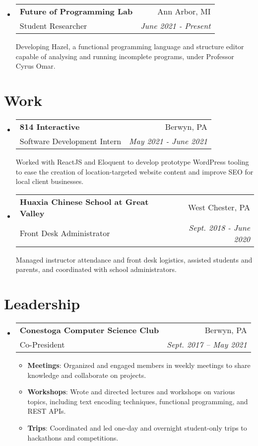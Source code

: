 \documentclass[letterpaper,11pt]{article}
\makeatletter
\newcommand{\resumeSubheading}[4]{
  \vspace{-2pt}\item
    \begin{tabular*}{0.97\textwidth}[t]{l@{\extracolsep{\fill}}r}
      \textbf{#1} & #2 \\
      {#3} & \textit{\small #4} \\[3pt]
    \end{tabular*}\vspace{-5pt}
}
\newcommand{\resumeSubheadingDescription}[1]{
  \parbox{0.97\textwidth}{#1}
}
\newenvironment{resumeSubHeadingList}{\begin{itemize}[leftmargin=*, label={}]}{\end{itemize}}
\newenvironment{resumeItemList}{\vspace{-2pt}\begin{itemize}}{\end{itemize}\vspace{-5pt}}
\newcommand{\resumeItem}[2]{\item\small{\textbf{#1}{: #2 \vspace{-2pt}}}}
\makeatother
\begin{document}
  \begin{resumeSubHeadingList}
    \resumeSubheading%
      {Future of Programming Lab}%
      {Ann Arbor, MI}%
      {Student Researcher}%
      {June 2021 - Present}

      \resumeSubheadingDescription{
        Developing Hazel, a functional programming language and structure editor capable of
        analysing and running incomplete programs, under Professor Cyrus Omar.
      }
  \end{resumeSubHeadingList}

\section{Work}
  \begin{resumeSubHeadingList}

    \resumeSubheading%
      {814 Interactive}%
      {Berwyn, PA}%
      {Software Development Intern}%
      {May 2021 - June 2021}

      \resumeSubheadingDescription{
        Worked with ReactJS and Eloquent to develop prototype WordPress tooling to ease the creation
        of location-targeted website content and improve SEO for local client businesses.
      }

    \resumeSubheading%
      {Huaxia Chinese School at Great Valley}%
      {West Chester, PA}%
      {Front Desk Administrator}%
      {Sept. 2018 - June 2020}

      \resumeSubheadingDescription{
        Managed instructor attendance and front desk logistics, assisted students and parents, and
        coordinated with school administrators.
      }

  \end{resumeSubHeadingList}

\section{Leadership}
  \begin{resumeSubHeadingList}

    \resumeSubheading%
      {Conestoga Computer Science Club}%
      {Berwyn, PA}%
      {Co-President}%
      {Sept. 2017 -- May 2021}

      \begin{resumeItemList}
        \resumeItem{Meetings}%
          {Organized and engaged members in weekly meetings to share knowledge and collaborate on
            projects.}
        \resumeItem{Workshops}%
          {Wrote and directed lectures and workshops on various topics, including text encoding
            techniques, functional programming, and REST APIs.}
        \resumeItem{Trips}%
          {Coordinated and led one-day and overnight student-only trips to hackathons and
            competitions.}
      \end{resumeItemList}

  \end{resumeSubHeadingList}
\end{document}
